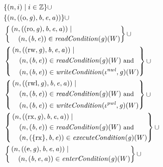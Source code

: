 \documentclass[compsoc,conference,letterpaper,fleqn]{IEEEtran}
\newcommand{\union}{\mathbin{\cup}}
\newcommand{\var}[1]{\mathit{#1}}
\newcommand{\gl}{\var{g}}
\newcommand{\addr}{\var{a}}
\newcommand{\start}{\var{b}}
\newcommand{\addrend}{\var{e}}
\newcommand{\perm}{\var{perm}}
\newcommand{\stdcap}[1][(\perm,\gl)]{\left(#1,\start,\addrend,\addr \right)}
\newcommand{\nwl}{\var{nwl}}
\newcommand{\pwl}{\var{pwl}}
\newcommand{\plainfun}[2]{
  \ifthenelse{\equal{#2}{}}
  {\mathit{#1}}
  {\mathit{#1}(#2)}
}
\newcommand{\readCond}[1]{\plainfun{readCondition}{#1}}
\newcommand{\writeCond}[1]{\plainfun{writeCondition}{#1}}
\newcommand{\execCond}[1]{\plainfun{executeCondition}{#1}}
\newcommand{\entryCond}[1]{\plainfun{enterCondition}{#1}}
\newcommand{\ints}{\mathbb{Z}}
\newcommand{\npair}[2][n]{\left(#1,#2 \right)}
\newcommand{\plainperm}[1]{\mathrm{#1}}
\newcommand{\noperm}{\plainperm{o}}
\newcommand{\readonly}{\plainperm{ro}}
\newcommand{\readwrite}{\plainperm{rw}}
\newcommand{\exec}{\plainperm{rx}}
\newcommand{\entry}{\plainperm{e}}
\newcommand{\readwritel}{\plainperm{rwl}}
\newlength{\oldmathindent}
\newenvironment{withmathindent}[1]{\setlength{\oldmathindent}{\mathindent}\setlength{\mathindent}{#1}}{\setlength{\mathindent}{\oldmathindent}}
\begin{document}
{\begin{figure}[htbp]
\begin{withmathindent}{0cm}
\begin{align*}
      &\;\;\begin{aligned}[t] & \{ \npair{i} \mid i \in \ints \}
        \union \\
        & \{ \npair{\stdcap[(\noperm,\gl)] } \}
        \union \\
        & \left\{
          \begin{multlined}
            \npair{\stdcap[(\readonly,\gl)] } \mid \\
            \npair{(\start,\addrend)} \in \readCond{}(\gl)(W)
          \end{multlined} \right\}
        \union \\
        & \left\{
          \begin{aligned}
            &\npair{\stdcap[(\readwrite,\gl)] } \mid \\
             &\quad\npair{(\start,\addrend)} \in \readCond{}(\gl)(W) \text{\footnotesize{ and }} \\
             &\quad\npair{(\start,\addrend)} \in
            \writeCond{}(\iota^\nwl,\gl)(W)
          \end{aligned} \right\} \union \\
        & \left\{
          \begin{aligned}
            &\npair{\stdcap[(\readwritel,\gl)] } \mid \\
             &\quad\npair{(\start,\addrend)} \in \readCond{}(\gl)(W) \text{\footnotesize{ and }} \\
             &\quad\npair{(\start,\addrend)} \in
            \writeCond{}(\iota^\pwl,\gl)(W)
          \end{aligned} \right\}
        \union \\
        & \left\{
          \begin{aligned}
            &\npair{\stdcap[(\exec,\gl)]} \mid \\
             &\quad\npair{(\start,\addrend)} \in \readCond{}(\gl)(W) \text{\footnotesize{ and }} \\
             &\quad\npair{(\{\exec\},\start,\addrend)} \in \execCond{}(\gl)(W)
          \end{aligned} \right\}
        \union \\
        & \left\{
          \begin{multlined}
            \npair{\stdcap[(\entry,\gl)]} \mid \\
            \npair{(\start,\addrend,\addr)} \in \entryCond{}(\gl)(W)
          \end{multlined} \right\}
        \union \\

\end{aligned}
\end{align*}
\end{withmathindent}
\end{figure}}
\end{document}
